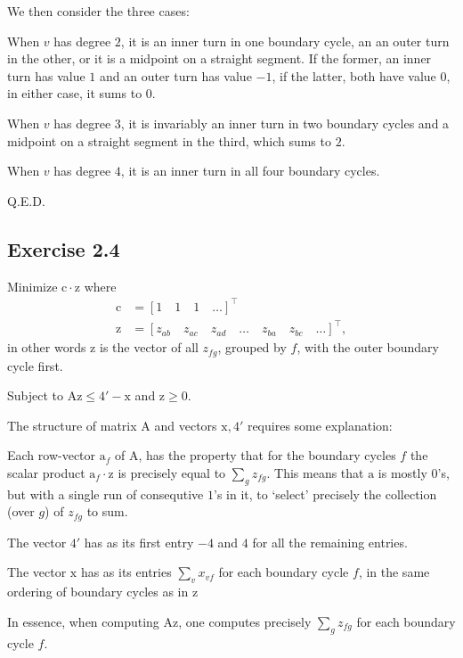 We then consider the three cases:

When $v$ has degree $2$, it is
an inner turn in one boundary cycle, an an outer turn in the other, or it is
a midpoint on a straight segment. If the former, an inner turn has value $1$
and an outer turn has value $-1$, if the latter, both have value $0$, in either
case, it sums to $0$.

When $v$ has degree $3$, it is invariably an inner turn in two boundary cycles
and a midpoint on a straight segment in the third, which sums to $2$.

When $v$ has degree $4$, it is an inner turn in all four boundary cycles.

Q.E.D.

\subsection{Exercise 2.4}

\newcommand\brm[1]{\bm{\mathrm{#1}}}

Minimize $\brm c \cdot \brm z$ where
\begin{align*}
  \brm c &= [1 \quad 1 \quad 1 \quad \dots ]^\intercal \\
  \brm z &= [z_{ab} \quad z_{ac} \quad z_{ad} \quad \dots \quad z_{ba} \quad z_{bc} \quad \dots ]^\intercal,
\end{align*}
in other words $\brm z$ is the vector of all $z_{fg}$, grouped by $f$, with the outer boundary cycle
first.

Subject to $\brm A \brm z \leqslant \brm{4'} - \brm x$ and $\brm z \geqslant \brm 0$.

The structure of matrix $\brm A$ and vectors $\brm x, \brm{4'}$ requires some explanation:

Each row-vector $\brm a_f$ of $\brm A$, has the property that for the boundary cycles $f$
the scalar product $\brm a_f \cdot \brm z$ is precisely equal to $\sum_g z_{fg}$. This means that
$\brm a$ is mostly $0$'s, but with a single run of consequtive $1$'s in it, to `select' precisely
the collection (over $g$) of $z_{fg}$ to sum.

The vector $\brm{4'}$ has as its first entry $ -4$ and $4$ for all the remaining entries.

The vector $\brm x$ has as its entries $\sum_v x_{vf}$ for each boundary cycle $f$, in the same
ordering of boundary cycles as in $\brm z$

In essence, when computing $\brm A \brm z$, one computes precisely  $\sum_g z_{fg}$ for each
boundary cycle $f$.

